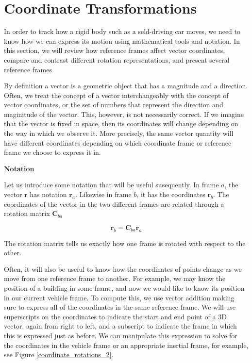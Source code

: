 \section{Coordinate Transformations}
\label{coordinate_transformations}


In order to  track how a rigid body such as a seld-driving car moves, we need to know how we can express its motion using
mathematical tools and notation. In this section, we will review how reference frames affect vector coordinates, compare and contrast different
rotation representations, and present several reference frames

By definition a vector  is a geometric object that has a magnitude and a direction.
Often, we treat the concept of a vector interchangeably with the concept
of vector coordinates, or the set of numbers that represent the direction and maginitude of the vector. This, however, is not necessarily correct. 
If we imagine that the vector is fixed in space, then its coordinates will change depending on the way in
which we observe it. More precisely, the same
vector quantity will have different coordinates depending on which coordinate
frame or reference frame we choose to express it in.

\begin{framed}
\theoremstyle{remark}
\begin{remark}{\textbf{Notation}}

Let us introduce some notation that will be useful susequently. 
In frame $a$, the vector $\mathbf{r}$ has notation $\mathbf{r}_a$. Likewise in frame $b$, it has the coordinates $\mathbf{r}_b$. 
The coordinates of the vector in the two different frames are related through a rotation matrix $\mathbf{C}_{ba}$

\begin{equation}
\mathbf{r}_b = \mathbf{C}_{ba}\mathbf{r}_a
\end{equation}

The rotation matrix tells us exactly how one frame is rotated with respect to the other.
\end{remark}
\end{framed} 

Often, it will also be useful to know how the coordinates of points change as we move from
one reference frame to another. For example, we may know the position
of a building in some frame, and now we would like to know its position in our current vehicle frame. 
To compute this, we use vector addition making sure to express all of the
coordinates in the same reference frame. We will use superscripts on the coordinates to indicate the start and
end point of a 3D vector, again from right to left, and a subscript to indicate
the frame in which this is expressed just as before. We can manipulate this expression
to solve for the coordinates in the vehicle frame or an appropriate
inertial frame, for example, see Figure \ref{coordinate_rotations_2}.

